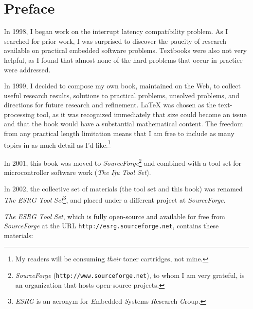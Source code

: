 \chapter{Preface}

In 1998, I began work on the
interrupt latency compatibility problem.  As I searched
for prior work, I was
surprised to discover the paucity
of research available on practical embedded software
problems.  Textbooks were also not very helpful,
as I found that almost none
of the hard
problems that occur in practice
were addressed.

In 1999, I decided to compose my own book,
maintained on the Web,
to collect useful
research results, solutions to practical problems,
unsolved problems, and directions for future
research and refinement.
\LaTeX{} was chosen as the text-processing
tool, as it was 
recognized immediately
that size could become an issue and that the book
would have a substantial mathematical content.
The freedom from any practical length
limitation
means that I am
free to include as many topics
in as much detail as I'd like.\footnote{My readers will
be consuming \emph{their} toner cartridges, not mine.}

In 2001, this book was moved to 
\emph{SourceForge}\footnote{\emph{SourceForge}
(\texttt{http://www.sourceforge.net}), to whom I am very grateful,
is an organization that hosts open-source projects.} and
combined with a tool
set for microcontroller software work 
(\emph{The Iju Tool Set}).

In 2002, the collective set of materials (the tool set and this book) 
was renamed \emph{The ESRG Tool Set}\footnote{\emph{ESRG}
is an acronym for \emph{E}mbedded \emph{S}ystems \emph{R}esearch \emph{G}roup.}, 
and placed under a different
project at \emph{SourceForge}.

\emph{The ESRG Tool Set}, which is fully open-source and 
available for free from \emph{SourceForge} at the URL
\texttt{http://esrg.sourceforge.net}, contains 
these materials: 

